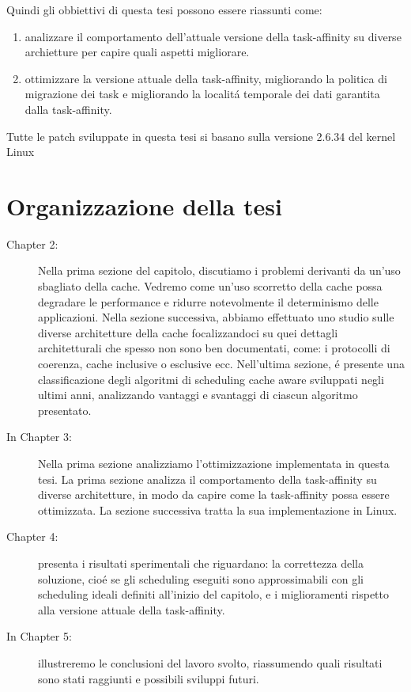 Quindi gli obbiettivi di questa tesi possono essere riassunti come:

\begin{enumerate}
\item analizzare il comportamento dell'attuale versione della task-affinity su diverse archietture per capire quali aspetti migliorare.
\item ottimizzare la versione attuale della task-affinity, migliorando la politica di migrazione dei task e migliorando la localit\'a temporale dei dati 
garantita dalla task-affinity.
\end{enumerate}

Tutte le patch sviluppate in questa tesi si basano sulla versione 2.6.34 del kernel Linux 

\section{Organizzazione della tesi}
\label{sec:OrganizzazioneTesi}

\begin{description}

\item [Chapter 2:] Nella prima sezione del capitolo, discutiamo i problemi derivanti da un'uso sbagliato della cache. Vedremo come un'uso scorretto della 
cache possa degradare le performance e ridurre notevolmente il determinismo delle applicazioni. Nella sezione successiva, abbiamo effettuato uno studio 
sulle diverse architetture della cache focalizzandoci su quei dettagli architetturali che spesso non sono ben documentati, come: i protocolli di coerenza, 
cache inclusive o esclusive ecc. Nell'ultima sezione, \'e presente una classificazione degli algoritmi di scheduling cache aware sviluppati negli ultimi 
anni, analizzando vantaggi e svantaggi di ciascun algoritmo presentato.  

\item [In Chapter 3:] Nella prima sezione analizziamo l'ottimizzazione implementata in questa tesi. La prima sezione analizza il comportamento della 
task-affinity su diverse architetture, in modo da capire come la task-affinity possa essere ottimizzata. La sezione successiva tratta la sua implementazione
in Linux.

\item [Chapter 4:] presenta i risultati sperimentali che riguardano: la correttezza della soluzione, cio\'e se gli scheduling eseguiti sono approssimabili 
con gli scheduling ideali definiti all'inizio del capitolo, e i miglioramenti rispetto alla versione attuale della task-affinity.

\item [In Chapter 5:] illustreremo le conclusioni del lavoro svolto, riassumendo quali risultati sono stati raggiunti e possibili sviluppi futuri.

\end{description}
